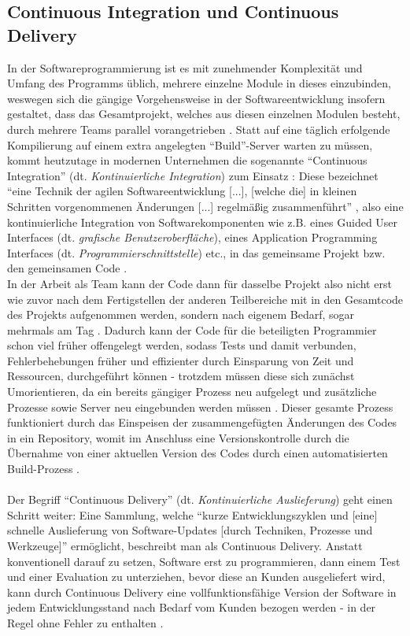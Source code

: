 \subsection{Continuous Integration und Continuous Delivery}
In der Softwareprogrammierung ist es mit zunehmender Komplexität und Umfang des Programms üblich, mehrere einzelne Module in dieses einzubinden, weswegen sich die gängige Vorgehensweise in der Softwareentwicklung insofern gestaltet, dass das Gesamtprojekt,
welches aus diesen einzelnen Modulen besteht, durch mehrere Teams parallel vorangetrieben \cite{HJL:2018aa}. Statt auf eine täglich erfolgende Kompilierung auf einem extra angelegten \enquote{Build}-Server warten zu müssen, kommt heutzutage in modernen
Unternehmen die sogenannte \enquote{Continuous Integration} (dt. \textit{Kontinuierliche Integration}) zum Einsatz \cite{HJL:2018aa}: Diese bezeichnet \enquote{eine Technik der agilen Softwareentwicklung [...], [welche die] in kleinen Schritten vorgenommenen Änderungen [...] 
regelmäßig zusammenführt} \cite{Dirk:2018aa}, also eine kontinuierliche Integration von Softwarekomponenten wie z.B. eines Guided User Interfaces (dt. \textit{grafische Benutzeroberfläche}), eines Application Programming Interfaces (dt. \textit{Programmierschnittstelle}) etc.,
in das gemeinsame Projekt bzw. den gemeinsamen Code \cite{HJL:2018aa}. \\ In der Arbeit als Team kann der Code dann für dasselbe Projekt also nicht erst wie zuvor nach dem Fertigstellen der anderen Teilbereiche mit in den Gesamtcode des Projekts aufgenommen werden, sondern nach 
eigenem Bedarf, sogar mehrmals am Tag \cite{Dirk:2018aa}. Dadurch kann der Code für die beteiligten Programmier schon viel früher offengelegt werden, sodass Tests und damit verbunden, Fehlerbehebungen früher und effizienter durch Einsparung von Zeit und Ressourcen, durchgeführt
können - trotzdem müssen diese sich zunächst Umorientieren, da ein bereits gängiger Prozess neu aufgelegt und zusätzliche Prozesse sowie Server neu eingebunden werden müssen \cite{HJL:2018aa, Dirk:2018aa}. Dieser gesamte Prozess funktioniert durch das Einspeisen der zusammengefügten
Änderungen des Codes in ein Repository, womit im Anschluss eine Versionskontrolle durch die Übernahme von einer aktuellen Version des Codes durch einen automatisierten Build-Prozess \cite{HJL:2018aa}. \\ \\
Der Begriff \enquote{Continuous Delivery} (dt. \textit{Kontinuierliche Auslieferung}) geht einen Schritt weiter: Eine Sammlung, welche \enquote{kurze Entwicklungszyklen und [eine] schnelle Auslieferung von Software-Updates [durch Techniken, Prozesse und Werkzeuge]} \cite{Ilanrr:2017aa}
ermöglicht, beschreibt man als Continuous Delivery. Anstatt konventionell darauf zu setzen, Software erst zu programmieren, dann einem Test und einer Evaluation zu unterziehen, bevor diese an Kunden ausgeliefert wird, kann durch Continuous Delivery eine vollfunktionsfähige Version der Software
in jedem Entwicklungsstand nach Bedarf vom Kunden bezogen werden - in der Regel ohne Fehler zu enthalten \cite{Ilanrr:2017aa}.

